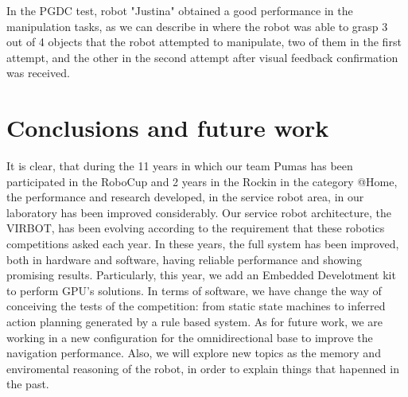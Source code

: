 \documentclass{llncs}
\begin{document}
In the PGDC test, robot "Justina" obtained a good performance in the manipulation tasks, as we can describe in \cite{iros2018} where the robot was able to grasp 3 out of 4 objects that the robot attempted to manipulate, two of them in the first attempt, and the other in the second attempt after visual feedback confirmation was received.


 





\section{Conclusions and future work}\label{sec:conclusions}
It is clear, that during the 11 years in which our team Pumas has been participated in the RoboCup and 2 years in the Rockin \cite{Robocup_2017} in the category @Home, the performance and research developed, in the service robot area, in our laboratory has been improved considerably.
Our service robot architecture, the VIRBOT, has been evolving according to the requirement that these robotics competitions asked each year.
In these years, the full system has been improved, both in hardware and software, having reliable performance and showing promising results. Particularly, this year, we add an Embedded Develotment kit \cite{jetson} to perform GPU's solutions.
In terms of software, we have change the way of conceiving the tests of the competition: from static state machines to inferred action planning generated by a rule based system. 
As for future work, we are working in a new configuration for the omnidirectional base to improve the navigation performance. Also, we will explore new topics as the memory and enviromental reasoning of the robot, in order to explain things that hapenned in the past.


\end{document}
